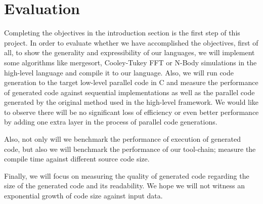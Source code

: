 \chapter{Evaluation}
Completing the objectives in the introduction section is the first step of this project. In order to evaluate whether we have accomplished the objectives, first of all, to show the generality and expressibility of our languages, we will implement some algorithms like mergesort, Cooley-Tukey FFT or N-Body simulations in the high-level language and compile it to our language. Also, we will run code generation to the target low-level parallel code in C and measure the performance of generated code against sequential implementations as well as the parallel code generated by the original method used in the high-level framework. We would like to observe there will be no significant loss of efficiency or even better performance by adding one extra layer in the process of parallel code generations.

Also, not only will we benchmark the performance of execution of generated code, but also we will benchmark the performance of our tool-chain; \eg measure the compile time against different source code size.

Finally, we will focus on measuring the quality of generated code regarding the size of the generated code and its readability. We hope we will not witness an exponential growth of code size against input data.